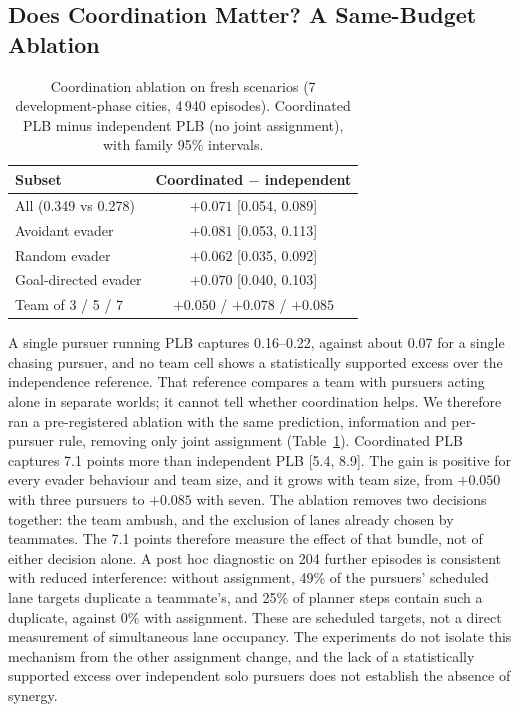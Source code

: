 \documentclass[5p,twocolumn]{elsarticle}
\begin{document}
\subsection{Does Coordination Matter? A Same-Budget Ablation}
\label{sec:ablation}

\begin{table}[!t]
\centering
\caption{Coordination ablation on fresh scenarios (7 development-phase cities, 4\,940 episodes). Coordinated PLB minus
independent PLB (no joint assignment), with family 95\% intervals.}
\label{tab:ablation}
\small
\setlength{\tabcolsep}{5pt}
\begin{tabular}{@{}lc@{}}
\toprule
Subset & Coordinated $-$ independent \\
\midrule
All (0.349 vs 0.278) & $+0.071$ [0.054, 0.089] \\
Avoidant evader & $+0.081$ [0.053, 0.113] \\
Random evader & $+0.062$ [0.035, 0.092] \\
Goal-directed evader & $+0.070$ [0.040, 0.103] \\
Team of 3 / 5 / 7 & $+0.050$ / $+0.078$ / $+0.085$ \\
\bottomrule
\end{tabular}
\end{table}

A single pursuer running PLB captures 0.16--0.22, against about 0.07 for a single chasing pursuer, and no team cell
shows a statistically supported excess over the independence reference. That reference compares a team with pursuers
acting alone in separate worlds; it cannot tell whether coordination helps. We therefore ran a pre-registered
ablation with the same prediction, information and per-pursuer rule, removing only joint assignment
(Table~\ref{tab:ablation}). Coordinated PLB captures 7.1 points more than independent PLB [5.4, 8.9]. The gain is
positive for every evader behaviour and team size, and it grows with team size, from $+0.050$ with three pursuers to
$+0.085$ with seven. The ablation removes two decisions together: the team ambush, and the exclusion of lanes already
chosen by teammates. The 7.1 points therefore measure the effect of that bundle, not of either decision alone. A post
hoc diagnostic on 204 further episodes is consistent with reduced interference: without assignment, 49\% of the
pursuers' scheduled lane targets duplicate a teammate's, and 25\% of planner steps contain such a duplicate, against
0\% with assignment. These are scheduled targets, not a direct measurement of simultaneous lane occupancy. The
experiments do not isolate this mechanism from the other assignment change, and the lack of a statistically supported
excess over independent solo pursuers does not establish the absence of synergy.
\end{document}
